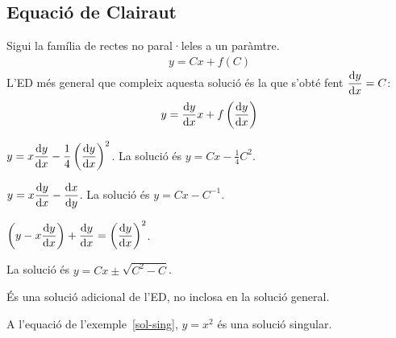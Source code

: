 \subsection{Equació de Clairaut}
\begin{defi}
	Sigui la família de rectes no paral·leles a un paràmtre.
	\begin{align}
		y = Cx + f(C)
	\end{align}
	L'ED més general que compleix aquesta solució és la que s'obté fent $\displaystyle \frac{\mathrm{d} y}{\mathrm{d} x} = C$:	\begin{align}
		y = \frac{\mathrm{d} y}{\mathrm{d} x} x + f\left( \frac{\mathrm{d} y}{\mathrm{d} x} \right)
	\end{align}
\end{defi}

\begin{example}\label{sol-sing}
	$\displaystyle y = x \frac{\mathrm{d} y}{\mathrm{d} x} - \frac{1}{4} \left( \frac{\mathrm{d} y}{\mathrm{d} x} \right)^{2}$. La solució és $\boxed{y = Cx - \frac{1}{4} C^{2}}$.
\end{example}
\begin{example}
	$\displaystyle y = x \frac{\mathrm{d} y}{\mathrm{d} x} - \frac{\mathrm{d} x}{\mathrm{d} y}$. La solució és $\boxed{y = Cx - C^{-1}}$.
\end{example}
\begin{example}
	$\displaystyle \left(y - x \frac{\mathrm{d} y}{\mathrm{d} x} \right) + \frac{\mathrm{d} y}{\mathrm{d} x} = \left( \frac{\mathrm{d} y}{\mathrm{d} x} \right)^{2}$.

    La solució és $\boxed{y = Cx \pm \sqrt{C^{2} - C}}$.
\end{example}

\begin{defi}
	És una solució adicional de l'ED, no inclosa en la solució general.
\end{defi}
\begin{example}
	A l'equació de l'exemple~\ref{sol-sing}, $\boxed{y = x^{2}}$ és una solució singular.
\end{example}

